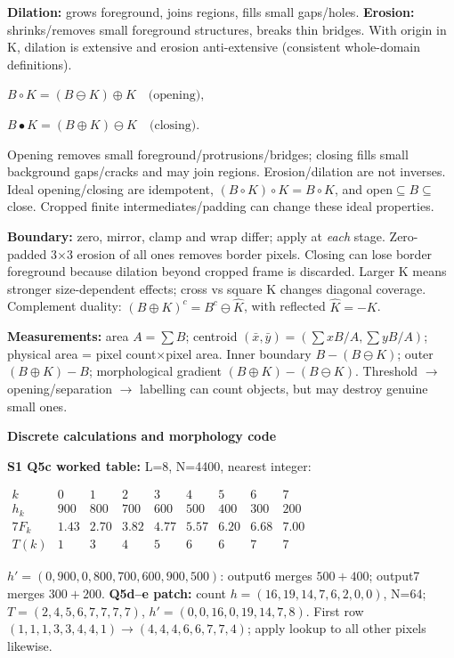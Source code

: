 \documentclass[a4paper]{article}
\newcommand{\key}[1]{\textbf{#1}}
\newcommand{\Topic}[1]{\par\vspace{1.7pt}\noindent
  {\fontsize{7.7}{8.0}\selectfont\bfseries #1}\par\vspace{0.3pt}}
\newcommand{\eq}[1]{\par\noindent\mbox{\(\displaystyle #1\)}\par}
\newcounter{sheet}
\newcounter{sheetcolumn}
\newlength{\colwidth}
\newenvironment{sheetcol}[1][7.0]{\stepcounter{sheetcolumn}
  \begin{lrbox}{\columnbox}\begin{minipage}[t]{\colwidth}\vspace{0pt}
  \fontsize{#1}{\dimexpr#1pt+0.6pt\relax}\selectfont}
  {\end{minipage}\end{lrbox}
  \typeout{CV1COL|\thesheet|\thesheetcolumn|\the\dimexpr\ht\columnbox+\dp\columnbox\relax}
  \usebox{\columnbox}\ignorespacesafterend}
\begin{document}
\begin{sheetcol}[6.45]
\key{Dilation:} grows foreground, joins regions, fills small gaps/holes. \key{Erosion:} shrinks/removes small foreground structures, breaks thin bridges. With origin in K, dilation is extensive and erosion anti-extensive (consistent whole-domain definitions).
\eq{B\circ K=(B\ominus K)\oplus K\quad\text{(opening)},}
\eq{B\bullet K=(B\oplus K)\ominus K\quad\text{(closing)}.}
Opening removes small foreground/protrusions/bridges; closing fills small background gaps/cracks and may join regions. Erosion/dilation are not inverses. Ideal opening/closing are idempotent, \((B\circ K)\circ K=B\circ K\), and open\(\subseteq B\subseteq\)close. Cropped finite intermediates/padding can change these ideal properties.

\key{Boundary:} zero, mirror, clamp and wrap differ; apply at \emph{each} stage. Zero-padded 3\(\times\)3 erosion of all ones removes border pixels. Closing can lose border foreground because dilation beyond cropped frame is discarded. Larger K means stronger size-dependent effects; cross vs square K changes diagonal coverage. Complement duality: \((B\oplus K)^c=B^c\ominus\hat K\), with reflected \(\hat K=-K\).

\key{Measurements:} area \(A=\sum B\); centroid \((\bar x,\bar y)=(\sum xB/A,\sum yB/A)\); physical area = pixel count\(\times\)pixel area. Inner boundary \(B-(B\ominus K)\); outer \((B\oplus K)-B\); morphological gradient \((B\oplus K)-(B\ominus K)\). Threshold \(\to\) opening/separation \(\to\) labelling can count objects, but may destroy genuine small ones.

\Topic{Discrete calculations and morphology code}
\key{S1 Q5c worked table:} L=8, N=4400, nearest integer:
\eq{\begin{array}{c|rrrrrrrr}
k&0&1&2&3&4&5&6&7\\
h_k&900&800&700&600&500&400&300&200\\
7F_k&1.43&2.70&3.82&4.77&5.57&6.20&6.68&7.00\\
T(k)&1&3&4&5&6&6&7&7
\end{array}}
\(h'=(0,900,0,800,700,600,900,500)\): output6 merges \(500+400\); output7 merges \(300+200\).
\key{Q5d--e patch:} count \(h=(16,19,14,7,6,2,0,0)\), N=64; \(T=(2,4,5,6,7,7,7,7)\), \(h'=(0,0,16,0,19,14,7,8)\). First row \((1,1,1,3,3,4,4,1)\to(4,4,4,6,6,7,7,4)\); apply lookup to all other pixels likewise.


\end{sheetcol}
\end{document}
